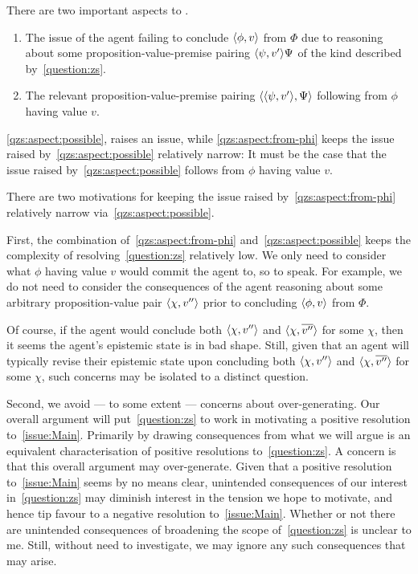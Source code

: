 \begin{note}
  There are two important aspects to \zs{}.
  \begin{enumerate}[label=\alph*., ref=(\alph*)]
  \item
    \label{qzs:aspect:possible}
    The issue of the agent failing to conclude \(\langle \phi, v \rangle\) from \(\Phi\) due to reasoning about some proposition-value-premise pairing \(\langle \psi, v' \rangle{\Psi}\) of the kind described by~\autoref{question:zs}.
  \item
    \label{qzs:aspect:from-phi}
    The relevant proposition-value-premise pairing \(\langle \langle \psi, v' \rangle, \Psi \rangle\) following from \(\phi\) having value \(v\).
  \end{enumerate}

  \ref{qzs:aspect:possible}, raises an issue, while \ref{qzs:aspect:from-phi} keeps the issue raised by~\ref{qzs:aspect:possible} relatively narrow:
  It must be the case that the issue raised by~\ref{qzs:aspect:possible} follows from \(\phi\) having value \(v\).

  There are two motivations for keeping the issue raised by~\ref{qzs:aspect:from-phi} relatively narrow via~\ref{qzs:aspect:possible}.

  First, the combination of~\ref{qzs:aspect:from-phi} and~\ref{qzs:aspect:possible} keeps the complexity of resolving~\autoref{question:zs} relatively low.
  We only need to consider what \(\phi\) having value \(v\) would commit the agent to, so to speak.
  For example, we do not need to consider the consequences of the agent reasoning about some arbitrary proposition-value pair \(\langle \chi, v'' \rangle\) prior to concluding \(\langle \phi, v \rangle\) from \(\Phi\).

  Of course, if the agent would conclude both \(\langle \chi, v'' \rangle\) and \(\langle \chi, \overline{v''} \rangle\) for some \(\chi\), then it seems the agent's epistemic state is in bad shape.
  Still, given that an agent will typically revise their epistemic state upon concluding both \(\langle \chi, v'' \rangle\) and \(\langle \chi, \overline{v''} \rangle\) for some \(\chi\), such concerns may be isolated to a distinct question.

  Second, we avoid --- to some extent --- concerns about over-generating.
  Our overall argument will put~\autoref{question:zs} to work in motivating a positive resolution to~\autoref{issue:Main}.
  Primarily by drawing consequences from what we will argue is an equivalent characterisation of positive resolutions to~\autoref{question:zs}.
  A concern is that this overall argument may over-generate.
  Given that a positive resolution to~\autoref{issue:Main} seems by no means clear, unintended consequences of our interest in~\autoref{question:zs} may diminish interest in the tension we hope to motivate, and hence tip favour to a negative resolution to~\autoref{issue:Main}.
  Whether or not there are unintended consequences of broadening the scope of~\autoref{question:zs} is unclear to me.
  Still, without need to investigate, we may ignore any such consequences that may arise.
\end{note}


